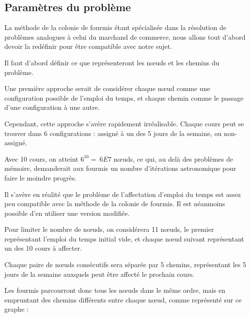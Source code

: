 
\subsection {Paramètres du problème}

La méthode de la colonie de fourmis étant spécialisée dans la résolution de problèmes analogues à celui du marchand de commerce, nous allons tout d'abord devoir la redéfinir pour être compatible avec notre sujet.

Il faut d'abord définir ce que représenteront les n\oe uds et les chemins du problème.

Une première approche serait de considérer chaque n\oe ud comme une configuration possible de l'emploi du temps, et chaque chemin comme le passage d'une configuration à une autre.

Cependant, cette approche s'avère rapidement irréalisable.
Chaque cours peut se trouver dans 6 configurations : assigné à un des 5 jours de la semaine, ou non-assigné.

Avec 10 cours, on atteint $6^{10} = ~6E7$ n\oe uds, ce qui, au delà des problèmes de mémoire, demanderait aux fourmis un nombre d'itérations astronomique pour faire le moindre progrès.

Il s'avère en réalité que le problème de l'affectation d'emploi du temps est assez peu compatible avec la méthode de la colonie de fourmis.
Il est néanmoins possible d'en utiliser une version modifiée.

Pour limiter le nombre de n\oe uds, on considérera 11 n\oe uds, le premier représentant l'emploi du temps initial vide, et chaque n\oe ud suivant représentant un des 10 cours à affecter.

Chaque paire de n\oe uds consécutifs sera séparée par 5 chemins, représentant les 5 jours de la semaine auxquels peut être affecté le prochain cours.

Les fourmis parcourront donc tous les n\oe uds dans le même ordre, mais en empruntant des chemins différents entre chaque n\oe ud, comme représenté sur ce graphe : 


